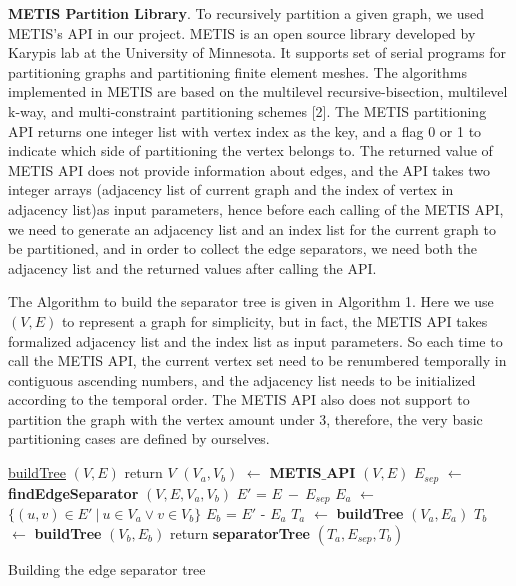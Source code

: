 \documentclass[12pt,glossary]{dalthesis}
\begin{document}
\textbf{METIS Partition Library}. To recursively partition a given graph, we used METIS's API in our project. METIS is an open source library developed by Karypis lab at the University of Minnesota. It supports set of serial programs for partitioning graphs and partitioning finite element meshes. The algorithms implemented in METIS are based on the multilevel recursive-bisection, multilevel k-way, and multi-constraint partitioning schemes [2]. The METIS partitioning API returns one integer list with vertex index as the key, and a flag 0 or 1 to indicate which side of partitioning the vertex belongs to. The returned value of METIS API does not provide information about edges, and the API takes two integer arrays (adjacency list of current graph and the index of vertex in adjacency list)as input parameters, hence before each calling of the METIS API, we need to generate an adjacency list and an index list for the current graph to be partitioned, and in order to collect the edge separators, we need both the adjacency list and the returned values after calling the API.

\bigskip
\bigskip

The Algorithm to build the separator tree is given in Algorithm 1. Here we use $(V,E)$
to represent a graph for simplicity, but in fact, the METIS API takes formalized adjacency list and the index list as input parameters. So each time to call the METIS API, the current vertex set need to be renumbered temporally in contiguous ascending numbers, and the adjacency list needs to be initialized according to the temporal order. The METIS API also does not support to partition the graph with the vertex amount under 3, therefore, the very basic partitioning cases are defined by ourselves.

\bigskip

\begin{algorithm}
    \underline{buildTree} $(V,E)$\;
      {
        return $V$\;
      }
      {
      	$(V_{a},V_{b})$ $\leftarrow$ \textbf{METIS$\_$API} $(V,E)$  \;
		$E_{sep}$ $\leftarrow$ \textbf{findEdgeSeparator} $(V,E,V_{a},V_{b})$ \;
		$E'$ = $E \  - \ E_{sep}$   \;
      	$E_{a}$ $\leftarrow$ $\{ (u,v) \in E' \ | \  u\in V_{a} \vee v \in V_{b} \}$ \;
		$E_{b}$ = $E'$ - $E_{a}$ \;
		$T_{a}$ $\leftarrow$ \textbf{buildTree} $(V_{a},E_{a})$ \;
		$T_{b}$ $\leftarrow$ \textbf{buildTree} $(V_{b},E_{b})$ \;  
        return \textbf{separatorTree} $(T_{a}, E_{sep}, T_{b})$ \; 
      }
    \caption{Building the edge separator tree}
\end{algorithm}
\bigskip
\end{document}
